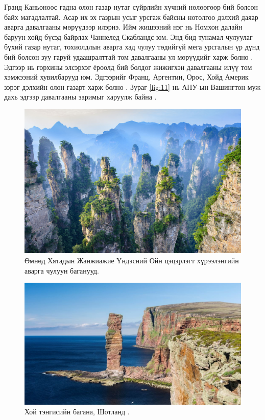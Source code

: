 \documentclass[10pt,twocolumn,letterpaper]{article}
\begin{document}
Гранд Каньоноос гадна олон газар нутаг сүйрлийн хүчний нөлөөгөөр бий болсон байх магадлалтай. Асар их эх газрын усыг урсгаж байсны нотолгоо дэлхий даяар аварга давалгааны мөрүүдээр илэрнэ. Ийм жишээний нэг нь Номхон далайн баруун хойд бүсэд байрлах Чаннелед Скабландс юм. Энд бид тунамал чулуулаг бүхий газар нутаг, тохиолдлын аварга хад чулуу төдийгүй мега урсгалын үр дүнд бий болсон зуу гаруй удаашралттай том давалгааны ул мөрүүдийг харж болно \cite{78,79}. Эдгээр нь горхины элсэрхэг ёроолд бий болдог жижигхэн давалгааны илүү том хэмжээний хувилбарууд юм. Эдгээрийг Франц, Аргентин, Орос, Хойд Америк зэрэг дэлхийн олон газарт харж болно \cite{81}. Зураг \ref{fig:11} нь АНУ-ын Вашингтон муж дахь эдгээр давалгааны заримыг харуулж байна \cite{80}.

\begin{figure}[b]
\begin{center}
   \includegraphics[width=1\linewidth]{zhangjiajie.jpg}
\end{center}
   \caption{Өмнөд Хятадын Жанжиажие Үндэсний Ойн цэцэрлэгт хүрээлэнгийн аварга чулуун баганууд.}
\label{fig:12}
\label{fig:onecol}
\end{figure}

\begin{figure}[b]
\begin{center}
\includegraphics[width=1\linewidth]{hoy.jpg}
\end{center}
   \caption{Хой тэнгисийн багана, Шотланд \cite{83}.}
\label{fig:13}
\label{fig:onecol}
\end{figure}
\end{document}
